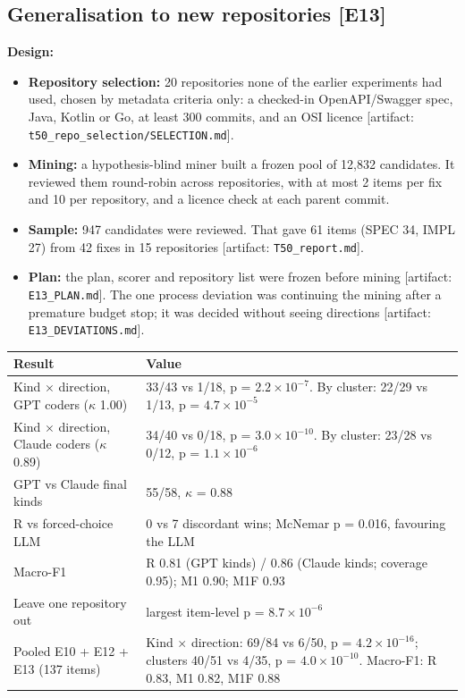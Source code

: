 \documentclass[acmsmall,screen,review,anonymous]{acmart}
\newcommand{\artifact}[1]{{\footnotesize [artifact: #1]}}
\begin{document}
\subsection{Generalisation to new repositories [E13]}
\textbf{Design:}
\begin{itemize}
\item \textbf{Repository selection:} 20 repositories none of the earlier experiments had used, chosen by metadata criteria only: a checked-in OpenAPI/Swagger spec, Java, Kotlin or Go, at least 300 commits, and an OSI licence \artifact{\texttt{t50\_repo\_selection/\allowbreak{}SELECTION.md}}.
\item \textbf{Mining:} a hypothesis-blind miner built a frozen pool of 12,832 candidates. It reviewed them round-robin across repositories, with at most 2 items per fix and 10 per repository, and a licence check at each parent commit.
\item \textbf{Sample:} 947 candidates were reviewed. That gave 61 items (SPEC 34, IMPL 27) from 42 fixes in 15 repositories \artifact{\texttt{T50\_report.md}}.
\item \textbf{Plan:} the plan, scorer and repository list were frozen before mining \artifact{\texttt{E13\_PLAN.md}}. The one process deviation was continuing the mining after a premature budget stop; it was decided without seeing directions \artifact{\texttt{E13\_DEVIATIONS.md}}.
\end{itemize}

\begin{table}[t]
\small
\begin{tabularx}{\linewidth}{lX}
\toprule
Result & Value \\
\midrule
Kind $\times$ direction, GPT coders ($\kappa$ 1.00) & 33/43 vs 1/18, p = $2.2 \times 10^{-7}$. By cluster: 22/29 vs 1/13, p = $4.7 \times 10^{-5}$ \\
Kind $\times$ direction, Claude coders ($\kappa$ 0.89) & 34/40 vs 0/18, p = $3.0 \times 10^{-10}$. By cluster: 23/28 vs 0/12, p = $1.1 \times 10^{-6}$ \\
GPT vs Claude final kinds & 55/58, $\kappa$ = 0.88 \\
R vs forced-choice LLM & 0 vs 7 discordant wins; McNemar p = 0.016, favouring the LLM \\
Macro-F1 & R 0.81 (GPT kinds) / 0.86 (Claude kinds; coverage 0.95); M1 0.90; M1F 0.93 \\
Leave one repository out & largest item-level p = $8.7 \times 10^{-6}$ \\
Pooled E10 + E12 + E13 (137 items) & Kind $\times$ direction: 69/84 vs 6/50, p = $4.2 \times 10^{-16}$; clusters 40/51 vs 4/35, p = $4.0 \times 10^{-10}$. Macro-F1: R 0.83, M1 0.82, M1F 0.88 \\
\bottomrule
\end{tabularx}
\end{table}
\end{document}
